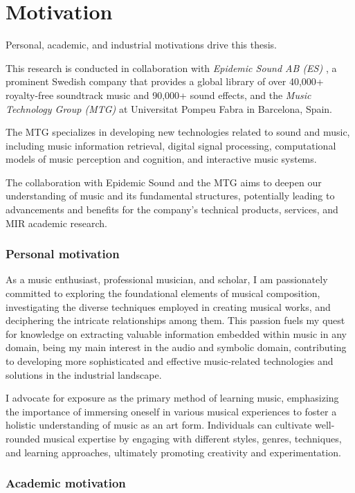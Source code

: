 \section{Motivation}

Personal, academic, and industrial motivations drive this thesis. 

This research is conducted in collaboration with \textit{Epidemic Sound AB (ES)} \cite{EpidemicSite}, a prominent Swedish company that provides a global library of over 40,000+ royalty-free soundtrack music and 90,000+ sound effects, and the \textit{Music Technology Group (MTG)} at Universitat Pompeu Fabra in Barcelona, Spain. 

The MTG specializes in developing new technologies related to sound and music, including music information retrieval, digital signal processing, computational models of music perception and cognition, and interactive music systems. 

The collaboration with Epidemic Sound and the MTG aims to deepen our understanding of music and its fundamental structures, potentially leading to advancements and benefits for the company's technical products, services, and MIR academic research.

\subsubsection{Personal motivation}

As a music enthusiast, professional musician, and scholar, I am passionately committed to exploring the foundational elements of musical composition, investigating the diverse techniques employed in creating musical works, and deciphering the intricate relationships among them. This passion fuels my quest for knowledge on extracting valuable information embedded within music in any domain, being my main interest in the audio and symbolic domain, contributing to developing more sophisticated and effective music-related technologies and solutions in the industrial landscape.

I advocate for exposure as the primary method of learning music, emphasizing the importance of immersing oneself in various musical experiences to foster a holistic understanding of music as an art form. Individuals can cultivate well-rounded musical expertise by engaging with different styles, genres, techniques, and learning approaches, ultimately promoting creativity and experimentation.

\subsubsection{Academic motivation}

